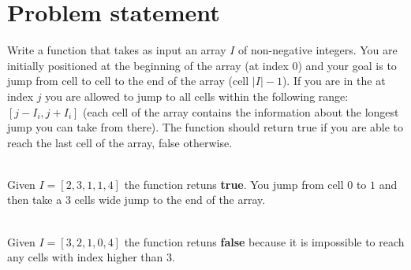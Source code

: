 \section{Problem statement}
\begin{exercise}
Write a function that takes as input  an array $I$ of non-negative integers. You are initially
positioned at the beginning of the array (at index $0$) and your goal is to jump from cell to cell
to the end of the array (cell $|I|-1$). If you are in the at index $j$ you are allowed to jump to
all cells within the following range: $[j-I_i,j+I_i]$ (each cell of the array contains the
information about the longest jump you can take from there). The function should return true if you
are able to reach the last cell of the array, false otherwise.

	\begin{example}
		\hfill \\
		Given  $I=[2,3,1,1,4]$ the function retuns \textbf{true}. You jump from cell $0$ to $1$ and
		then take a $3$ cells wide jump to the end of the array. 
	\end{example}

	\begin{example}
		\hfill \\
		Given $I=[3,2,1,0,4]$ the function retuns \textbf{false} because it is impossible to reach
		any cells with index higher than $3$.
		
	\end{example}
\end{exercise}


	

